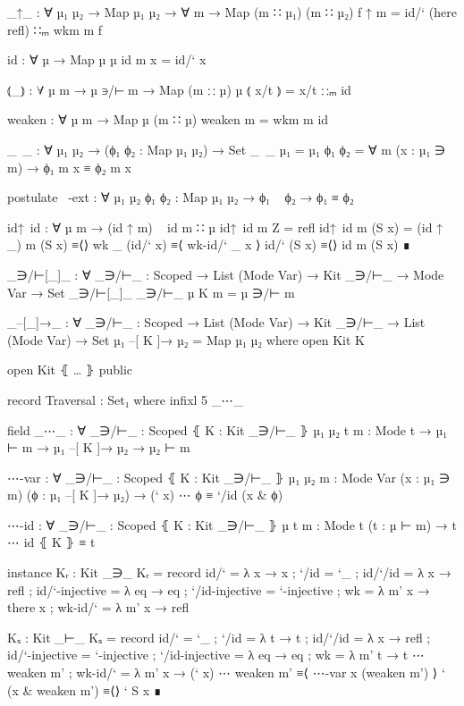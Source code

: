 \begin{code}
    _↑_ : ∀ {µ₁ µ₂} → Map µ₁ µ₂ → ∀ m → Map (m ∷ µ₁) (m ∷ µ₂)
    f ↑ m = id/` (here refl) ∷ₘ wkm m f
      
    id : ∀ {µ} → Map µ µ
    id m x = id/` x

    ⦅_⦆ : ∀ {µ m} → µ ∋/⊢ m → Map (m ∷ µ) µ
    ⦅ x/t ⦆ = x/t ∷ₘ id

    weaken : ∀ {µ} m → Map µ (m ∷ µ)
    weaken m = wkm m id

    _~_ :
      ∀ {µ₁ µ₂}
      → (ϕ₁ ϕ₂ : Map µ₁ µ₂)
      → Set
    _~_ {µ₁ = µ₁} ϕ₁ ϕ₂ = ∀ m (x : µ₁ ∋ m) → ϕ₁ m x ≡ ϕ₂ m x

    postulate
      ~-ext : 
        ∀ {µ₁ µ₂} {ϕ₁ ϕ₂ : Map µ₁ µ₂}
        → ϕ₁ ~ ϕ₂
        → ϕ₁ ≡ ϕ₂

    id↑~id : ∀ {µ m} → (id ↑ m) ~ id {m ∷ µ}
    id↑~id m Z     = refl
    id↑~id m (S x) =
      (id ↑ _) m (S x) ≡⟨⟩
      wk _ (id/` x)    ≡⟨ wk-id/` _ x ⟩
      id/` (S x)       ≡⟨⟩
      id m (S x)       ∎

  _∋/⊢[_]_ : ∀ {_∋/⊢_ : Scoped} → List (Mode Var) → Kit _∋/⊢_ → Mode Var → Set
  _∋/⊢[_]_ {_∋/⊢_} µ K m = µ ∋/⊢ m

  _–[_]→_ : ∀ {_∋/⊢_ : Scoped} → List (Mode Var) → Kit _∋/⊢_ → List (Mode Var) → Set
  µ₁ –[ K ]→ µ₂ = Map µ₁ µ₂ where open Kit K

  open Kit ⦃ … ⦄ public

  record Traversal : Set₁ where
    infixl   5  _⋯_

    field
      _⋯_   :
        ∀ {_∋/⊢_ : Scoped} ⦃ K : Kit _∋/⊢_ ⦄ {µ₁ µ₂ t} {m : Mode t} 
        → µ₁ ⊢ m → µ₁ –[ K ]→ µ₂ → µ₂ ⊢ m

      ⋯-var :
        ∀ {_∋/⊢_ : Scoped} ⦃ K : Kit _∋/⊢_ ⦄ {µ₁ µ₂} {m : Mode Var} 
          (x : µ₁ ∋ m) (ϕ : µ₁ –[ K ]→ µ₂)
        → (` x) ⋯ ϕ ≡ `/id (x & ϕ)

      ⋯-id :
        ∀ {_∋/⊢_ : Scoped} ⦃ K : Kit _∋/⊢_ ⦄ {µ t} {m : Mode t} 
          (t : µ ⊢ m)
        → t ⋯ id ⦃ K ⦄ ≡ t

    instance
      Kᵣ : Kit _∋_
      Kᵣ = record
        { id/`           = λ x → x
        ; `/id           = `_
        ; id/`/id        = λ x → refl
        ; id/`-injective = λ eq → eq
        ; `/id-injective = `-injective
        ; wk             = λ m' x → there x
        ; wk-id/`        = λ m' x → refl
        }

      Kₛ : Kit _⊢_
      Kₛ = record
        { id/`           = `_
        ; `/id           = λ t → t
        ; id/`/id        = λ x → refl
        ; id/`-injective = `-injective
        ; `/id-injective = λ eq → eq
        ; wk             = λ m' t → t ⋯ weaken m'
        ; wk-id/`        = λ m' x → (` x) ⋯ weaken m' ≡⟨ ⋯-var x (weaken m') ⟩
                                    ` (x & weaken m') ≡⟨⟩
                                    ` S x             ∎
        }


\end{code}
